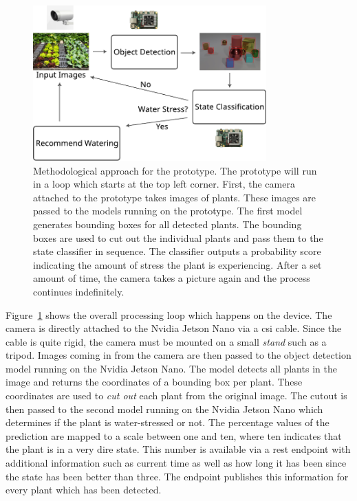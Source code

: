 \documentclass[final]{vutinfth} %
\begin{document}
\begin{figure}
  \centering
  \includegraphics[width=0.8\textwidth]{graphics/setup.pdf}
  \caption[Methodological approach for the prototype.]{Methodological
    approach for the prototype. The prototype will run in a loop which
    starts at the top left corner. First, the camera attached to the
    prototype takes images of plants. These images are passed to the
    models running on the prototype. The first model generates
    bounding boxes for all detected plants. The bounding boxes are
    used to cut out the individual plants and pass them to the state
    classifier in sequence. The classifier outputs a probability score
    indicating the amount of stress the plant is experiencing. After a
    set amount of time, the camera takes a picture again and the
    process continues indefinitely.}
  \label{fig:setup}
\end{figure}

Figure~\ref{fig:setup} shows the overall processing loop which happens
on the device. The camera is directly attached to the Nvidia Jetson
Nano via a \gls{csi} cable. Since the cable is quite rigid, the camera
must be mounted on a small \emph{stand} such as a tripod. Images
coming in from the camera are then passed to the object detection
model running on the Nvidia Jetson Nano. The model detects all plants
in the image and returns the coordinates of a bounding box per
plant. These coordinates are used to \emph{cut out} each plant from
the original image. The cutout is then passed to the second model
running on the Nvidia Jetson Nano which determines if the plant is
water-stressed or not. The percentage values of the prediction are
mapped to a scale between one and ten, where ten indicates that the
plant is in a very dire state. This number is available via a
\gls{rest} endpoint with additional information such as current time
as well as how long it has been since the state has been better than
three. The endpoint publishes this information for every plant which
has been detected.
\end{document}

